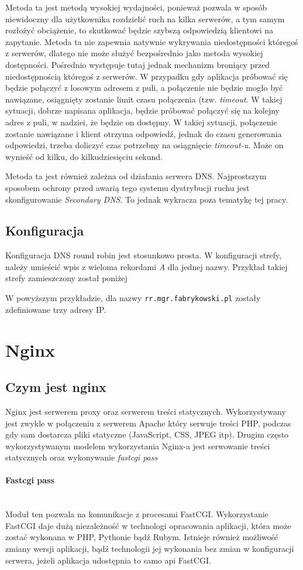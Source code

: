 {Metoda ta jest metodą wysokiej wydajności, ponieważ pozwala w sposób niewidoczny dla użytkownika rozdzielić ruch na kilka serwerów, a tym samym rozłożyć obciążenie, to skutkować będzie szybszą odpowiedzią klientowi na zapytanie.
Metoda ta nie zapewnia natywnie wykrywania niedostępności któregoś z serwerów, dlatego nie może służyć bezpośrednio jako metoda wysokiej dostępności.
Pośrednio występuje tutaj jednak mechanizm broniący przed niedostępnością któregoś z serwerów. W przypadku gdy aplikacja próbować się będzie połączyć z losowym adresem z puli, a połączenie nie będzie mogło być nawiązane, osiągnięty zostanie limit czasu połączenia (tzw. \textit{timeout}. W takiej sytuacji, dobrze napisana aplikacja, będzie próbować połączyć się na kolejny adres z puli, w nadziei, że będzie on dostępny.
W takiej sytuacji, połączenie zostanie nawiązane i klient otrzyma odpowiedź, jednak do czasu generowania odpowiedzi, trzeba doliczyć czas potrzebny na osiągnięcie \textit{timeout-u}. Może on wynieść od kilku, do kilkudziesięciu sekund.

Metoda ta jest również zależna od działania serwera DNS.
Najprostszym sposobem ochrony przed awarią tego systemu dystrybucji ruchu jest skonfigurowanie \textit{Secondary DNS}. To jednak wykracza poza tematykę tej pracy.
\subsection{Konfiguracja}
Konfiguracja DNS round robin jest stosunkowo prosta.
W konfiguracji strefy, należy umieścić wpis z wieloma rekordami \textit{A} dla jednej nazwy.
Przykład takiej strefy zamieszczony został poniżej

W powyższym przykładzie, dla nazwy \texttt{rr.mgr.fabrykowski.pl} zostały zdefiniowane trzy adresy IP.
\section{Nginx}
\subsection{Czym jest nginx}
Nginx jest serwerem proxy oraz serwerem treści statycznych.
Wykorzystywany jest zwykle w połączeniu z serwerem Apache który serwuje treści PHP, podczas gdy sam dostarcza pliki statyczne (JavaScript, CSS, JPEG itp).
Drugim często wykorzystywanym modelem wykorzystania Nginx-a jest serwowanie treści statycznych oraz wykonywanie \textit{fastcgi pass}
\paragraph{Fastcgi pass} \hspace{0pt} \\
Moduł ten pozwala na komunikacje z procesami FastCGI.
Wykorzystanie FastCGI daje dużą niezależność w technologi opracowania aplikacji, która może zostać wykonana w PHP, Pythonie bądź Rubym.
Istnieje również możliwość zmiany wersji aplikacji, bądź technologii jej wykonania bez zmian w konfiguracji serwera, jeżeli aplikacja udostępnia to samo api FastCGI.

}
